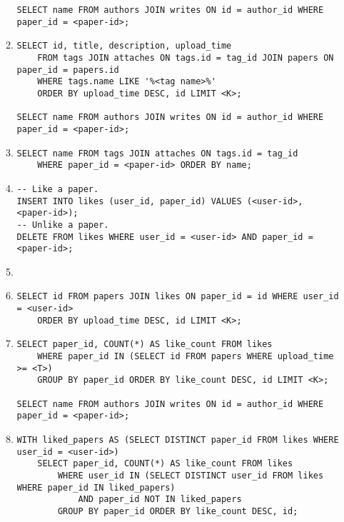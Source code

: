\documentclass{article}
\begin{document}
\begin{enumerate}
\begin{enumerate}
\begin{verbatim}
SELECT name FROM authors JOIN writes ON id = author_id WHERE paper_id = <paper-id>;
\end{verbatim}

        \item \begin{verbatim}
SELECT id, title, description, upload_time
    FROM tags JOIN attaches ON tags.id = tag_id JOIN papers ON paper_id = papers.id
    WHERE tags.name LIKE '%<tag name>%'
    ORDER BY upload_time DESC, id LIMIT <K>;

SELECT name FROM authors JOIN writes ON id = author_id WHERE paper_id = <paper-id>;
\end{verbatim}

        \item \begin{verbatim}
SELECT name FROM tags JOIN attaches ON tags.id = tag_id
    WHERE paper_id = <paper-id> ORDER BY name;
\end{verbatim}

        \item \begin{verbatim}
-- Like a paper.
INSERT INTO likes (user_id, paper_id) VALUES (<user-id>, <paper-id>);
-- Unlike a paper.
DELETE FROM likes WHERE user_id = <user-id> AND paper_id = <paper-id>;
\end{verbatim}

        \item {}
        
        \item \begin{verbatim}
SELECT id FROM papers JOIN likes ON paper_id = id WHERE user_id = <user-id>
    ORDER BY upload_time DESC, id LIMIT <K>;
\end{verbatim}

        \item \begin{verbatim}
SELECT paper_id, COUNT(*) AS like_count FROM likes
    WHERE paper_id IN (SELECT id FROM papers WHERE upload_time >= <T>)
    GROUP BY paper_id ORDER BY like_count DESC, id LIMIT <K>;

SELECT name FROM authors JOIN writes ON id = author_id WHERE paper_id = <paper-id>;
\end{verbatim}

        \item \begin{verbatim}
WITH liked_papers AS (SELECT DISTINCT paper_id FROM likes WHERE user_id = <user-id>)
    SELECT paper_id, COUNT(*) AS like_count FROM likes
        WHERE user_id IN (SELECT DISTINCT user_id FROM likes WHERE paper_id IN liked_papers)
            AND paper_id NOT IN liked_papers
        GROUP BY paper_id ORDER BY like_count DESC, id;
\end{verbatim}


\end{enumerate}
\end{enumerate}
\end{document}
